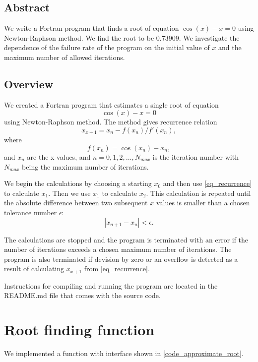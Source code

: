 \subsection{Abstract}

We write a Fortran program that finds a root of equation $\cos(x) - x = 0$ using Newton-Raphson method. We find the root to be $0.73909$. We investigate the dependence of the failure rate of the program on the initial value of $x$ and the maximum number of allowed iterations.

\subsection{Overview}

We created a Fortran program that estimates a single root of equation
\begin{equation}
  \cos(x) - x = 0
  \label{eq_root}
\end{equation}
using Newton-Raphson method. The method gives recurrence relation
\begin{equation}
  x_{x+1} = x_n - f(x_n) / f'(x_n),
  \label{eq_recurrence}
\end{equation}
where
\[
  f(x_n) = \cos(x_n) - x_n,
\]
and $x_n$ are the x values, and $n = 0, 1, 2, \dots, N_{max}$ is the iteration number with $N_{max}$ being the maximum number of iterations.

We begin the calculations by choosing a starting $x_0$ and then use \autoref{eq_recurrence} to calculate $x_1$. Then we use $x_1$ to calculate $x_2$. This calculation is repeated until the absolute difference between two subsequent $x$ values is smaller than a chosen tolerance number $\epsilon$:
\[
  |{x_{n+1} - x_n}| < \epsilon.
\]

The calculations are stopped and the program is terminated with an error if the number of iterations exceeds a chosen maximum number of iterations. The program is also terminated if devision by zero or an overflow is detected as a result of calculating $x_{x+1}$ from \autoref{eq_recurrence}.

Instructions for compiling and running the program are located in the README.md file that comes with the source code.


\section{Root finding function}

We implemented a function  with interface shown in \autoref{code_approximate_root}.

